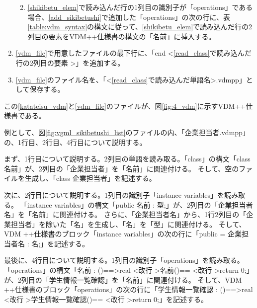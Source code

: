 \begin{enumerate}
\begin{enumerate}
\begin{enumerate}
                \end{enumerate}
            \item \ref{shikibetu_elem}で読み込んだ行の1列目の識別子が「operations」である場合、\ref{add_sikibetushi}で追加した「operations」の次の行に、表{\ref{table:vdm_syntax}}の構文に従って、\ref{shikibetu_elem}で読み込んだ行の2列目の要素をVDM++仕様書の構文の「名前」に挿入する。
        \end{enumerate}
    \item \ref{vdm_file}で用意したファイルの最下行に、「end \textless \ref{read_class}で読み込んだ行の2列目の要素 \textgreater」を追加する。
    \item \ref{vdm_file}のファイル名を、「\textless \ref{read_class}で読み込んだ単語名\textgreater.vdmpp」として保存する。
\end{enumerate}

この\ref{katateisu_vdm}と\ref{vdm_file}のファイルが、図\ref{fig:4_vdm}に示すVDM++仕様書である。

例として、図\ref{fig:vgml_sikibetushi_list}のファイルの内、「企業担当者.vdmpp」の、1行目、2行目、4行目について説明する。

まず、1行目について説明する。2列目の単語を読み取る。「class」の構文「class 名前」が、2列目の「企業担当者」を「名前」に関連付ける。
そして、空のファイルを生成し、「class 企業担当者」を記述する。

次に、2行目について説明する。1列目の識別子「instance variables」を読み取る。
「instance variables」の構文「public 名前 : 型;」が、2列目の「企業担当者名」を「名前」に関連付ける。
さらに、「企業担当者名」から、1行2列目の「企業担当者」を除いた「名」を生成し、「名」を「型」に関連付ける。
そして、VDM ++仕様書のブロック「instance variables」の次の行に「public  = 企業担当者名 : 名;」を記述する。

最後に、4行目について説明する。1列目の識別子「operations」を読み取る。
「operations」の構文「名前 : ()==\textgreater real \textless 改行 \textgreater 名前()== \textless 改行 \textgreater return 0;」が、2列目の「学生情報一覧確認」を「名前」に関連付ける。
そして、VDM ++仕様書のブロック「operations」の次の行に「学生情報一覧確認 : ()==\textgreater real \textless 改行 \textgreater 学生情報一覧確認()== \textless 改行 \textgreater return 0;」を記述する。
